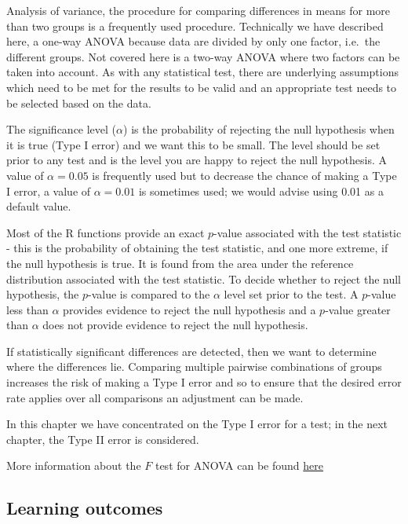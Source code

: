 \documentclass[
  oneside]{krantz}
\begin{document}
Analysis of variance, the procedure for comparing differences in means for more than two groups is a frequently used procedure. Technically we have described here, a one-way ANOVA because data are divided by only one factor, i.e.~the different groups. Not covered here is a two-way ANOVA where two factors can be taken into account. As with any statistical test, there are underlying assumptions which need to be met for the results to be valid and an appropriate test needs to be selected based on the data.

The significance level (\(\alpha\)) is the probability of rejecting the null hypothesis when it is true (Type I error) and we want this to be small. The level should be set prior to any test and is the level you are happy to reject the null hypothesis. A value of \(\alpha=0.05\) is frequently used but to decrease the chance of making a Type I error, a value of \(\alpha=0.01\) is sometimes used; we would advise using 0.01 as a default value.

Most of the R functions provide an exact \(p\)-value associated with the test statistic - this is the probability of obtaining the test statistic, and one more extreme, if the null hypothesis is true. It is found from the area under the reference distribution associated with the test statistic. To decide whether to reject the null hypothesis, the \(p\)-value is compared to the \(\alpha\) level set prior to the test. A \(p\)-value less than \(\alpha\) provides evidence to reject the null hypothesis and a \(p\)-value greater than \(\alpha\) does not provide evidence to reject the null hypothesis.

If statistically significant differences are detected, then we want to determine where the differences lie. Comparing multiple pairwise combinations of groups increases the risk of making a Type I error and so to ensure that the desired error rate applies over all comparisons an adjustment can be made.

In this chapter we have concentrated on the Type I error for a test; in the next chapter, the Type II error is considered.

More information about the \(F\) test for ANOVA can be found \href{https://www.khanacademy.org/math/probability/statistics-inferential/anova/v/anova-3-hypothesis-test-with-f-statistic}{here}

\hypertarget{learning-outcomes-6}{%
\subsection{Learning outcomes}\label{learning-outcomes-6}}
\end{document}
